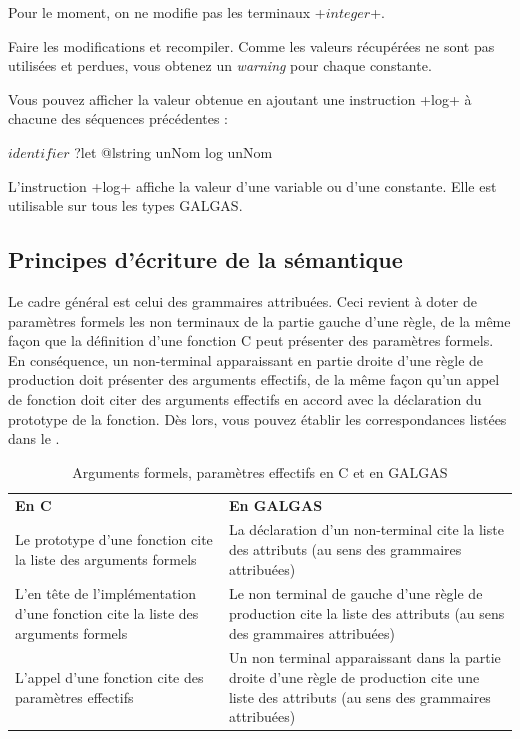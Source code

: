 Pour le moment, on ne modifie pas les terminaux \ggs+$integer$+.

Faire les modifications et recompiler. Comme les valeurs récupérées ne sont pas utilisées et perdues, vous obtenez un \emph{warning} pour chaque constante.

Vous pouvez afficher la valeur obtenue en ajoutant une instruction \ggs+log+ à chacune des séquences précédentes :
\begin{galgas}
$identifier$ ?let @lstring unNom
log unNom
\end{galgas}

L'instruction \ggs+log+ affiche la valeur d'une variable ou d’une constante. Elle est utilisable sur tous les types GALGAS.

\subsection{Principes d'écriture de la sémantique}

Le cadre général est celui des grammaires attribuées. Ceci revient à doter de paramètres formels les non terminaux de la partie gauche d'une règle, de la même façon que la définition d'une fonction C peut présenter des paramètres formels. En conséquence, un non-terminal apparaissant en partie droite d'une règle de production doit présenter des arguments effectifs, de la même façon qu'un appel de fonction doit citer des arguments effectifs en accord avec la déclaration du prototype de la fonction. Dès lors, vous pouvez établir les correspondances listées dans le .

\begin{table}[t]
  \centering
  \begin{tabular}{p{8cm}p{6.7cm}}
    \textbf{En C} & \textbf{En GALGAS} \\
     Le prototype d'une fonction cite la liste des arguments formels & La déclaration d'un non-terminal cite la liste des attributs (au sens des grammaires attribuées) \\
     L'en tête de l'implémentation d'une fonction cite la liste des arguments formels & Le non terminal de gauche d'une règle de production cite la liste des attributs (au sens des grammaires attribuées) \\
     L'appel d'une fonction cite des paramètres effectifs & Un non terminal apparaissant dans la partie droite d'une règle de production cite une liste des attributs (au sens des grammaires attribuées) \\
  \end{tabular}
  \caption{Arguments formels, paramètres effectifs en C et en GALGAS}
  \ligne
\end{table}

